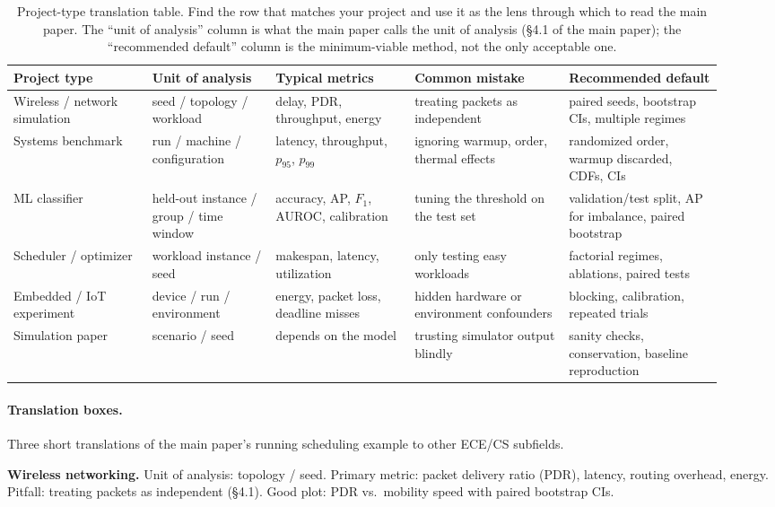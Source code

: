\documentclass[11pt]{article}
\begin{document}
\begin{table}[h]
\centering
\footnotesize
\setlength{\tabcolsep}{4pt}
\renewcommand{\arraystretch}{1.25}
\begin{tabular}{p{0.18\linewidth}p{0.16\linewidth}p{0.18\linewidth}p{0.20\linewidth}p{0.20\linewidth}}
\toprule
Project type & Unit of analysis & Typical metrics & Common mistake & Recommended default \\
\midrule
Wireless / network simulation & seed / topology / workload & delay, PDR, throughput, energy & treating packets as independent & paired seeds, bootstrap CIs, multiple regimes \\
Systems benchmark & run / machine / configuration & latency, throughput, $p_{95}$, $p_{99}$ & ignoring warmup, order, thermal effects & randomized order, warmup discarded, CDFs, CIs \\
ML classifier & held-out instance / group / time window & accuracy, AP, $F_1$, AUROC, calibration & tuning the threshold on the test set & validation/test split, AP for imbalance, paired bootstrap \\
Scheduler / optimizer & workload instance / seed & makespan, latency, utilization & only testing easy workloads & factorial regimes, ablations, paired tests \\
Embedded / IoT experiment & device / run / environment & energy, packet loss, deadline misses & hidden hardware or environment confounders & blocking, calibration, repeated trials \\
Simulation paper & scenario / seed & depends on the model & trusting simulator output blindly & sanity checks, conservation, baseline reproduction \\
\bottomrule
\end{tabular}
\caption{Project-type translation table. Find the row that matches your
project and use it as the lens through which to read the main paper. The
``unit of analysis'' column is what the main paper calls the unit of
analysis (\S4.1 of the main paper); the ``recommended default'' column is
the minimum-viable method, not the only acceptable one.}
\label{tab:project-type}
\end{table}

\paragraph{Translation boxes.} Three short translations of the main paper's
running scheduling example to other ECE/CS subfields.

\begin{shaded*}
\noindent\textbf{Wireless networking.}
Unit of analysis: topology / seed.
Primary metric: packet delivery ratio (PDR), latency, routing overhead, energy.
Pitfall: treating packets as independent (\S4.1).
Good plot: PDR vs.\ mobility speed with paired bootstrap CIs.
\end{shaded*}
\end{document}
